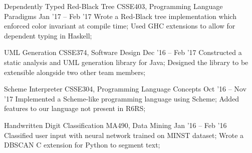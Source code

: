 \documentclass{resume}
\begin{document}
\begin{resumeheader}
\end{resumeheader}

\begin{resumebody}


        
        
        
        
        
        
        

        \experience
            {Dependently Typed Red-Black Tree}
            {CSSE403, Programming Language Paradigms}
            {Jan '17 -- Feb '17}
            {
                Wrote a Red-Black tree implementation which enforced color invariant at compile time;
                Used GHC extensions to allow for dependent typing in Haskell;
            }

        \experience
            {UML Generation}
            {CSSE374, Software Design}
            {Dec '16 -- Feb '17}
            {
                Constructed a static analysis and UML generation library for Java;
                Designed the library to be extensible alongside two other team members;
            }

        \experience
            {Scheme Interpreter}
            {CSSE304, Programming Language Concepts}
            {Oct '16 -- Nov '17}
            {
                Implemented a Scheme-like programming language using Scheme;
                Added features to our language not present in R6RS;
            }

        \experience
            {Handwritten Digit Classification}
            {MA490, Data Mining}
            {Jan '16 -- Feb '16}
            {
                Classified user input with neural network trained on MINST dataset;
                Wrote a DBSCAN C extension for Python to segment text;
            }




\end{resumebody}
\end{document}
